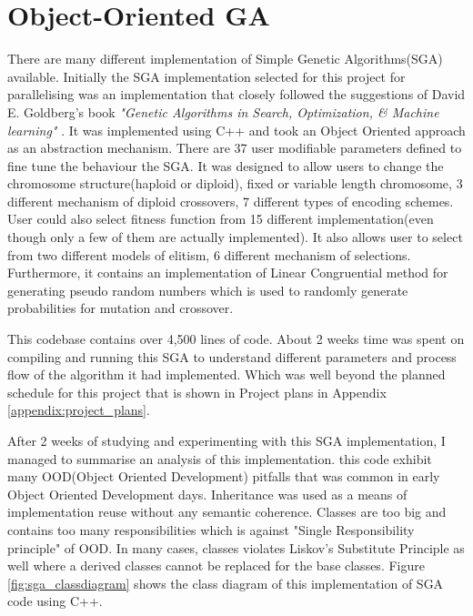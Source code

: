 \section{Object-Oriented GA}
There are many different implementation of Simple Genetic Algorithms(SGA) available. Initially the SGA implementation selected for this project for parallelising was an implementation that closely followed the suggestions of David E. Goldberg's book \textit{"Genetic Algorithms in Search, Optimization, \& Machine learning"} \citep{Goldberg:89}. It was implemented using C++ and took an Object Oriented approach as an abstraction mechanism. There are 37 user modifiable parameters defined to fine tune the behaviour the SGA. It was designed to allow users to change the chromosome structure(haploid or diploid), fixed or variable length chromosome, 3 different mechanism of diploid crossovers, 7 different types of encoding schemes. User could also select fitness function from 15 different implementation(even though only a few of them are actually implemented). It also allows user to select from two different models of elitism, 6 different mechanism of selections. Furthermore, it contains an implementation of Linear Congruential method for generating pseudo random numbers which is used to randomly generate probabilities for mutation and crossover.

This codebase contains over 4,500 lines of code. About 2 weeks time was spent on compiling and running this SGA to understand different parameters and process flow of the algorithm it had implemented. Which was well beyond the planned schedule for this project that is shown in Project plans in Appendix \ref{appendix:project_plans}.

After 2 weeks of studying and experimenting with this SGA implementation, I managed to summarise an analysis of this implementation. this code exhibit many OOD(Object Oriented Development) pitfalls that was common in early Object Oriented Development days. Inheritance was used as a means of implementation reuse without any semantic coherence. Classes are too big and contains too many responsibilities which is against "Single Responsibility principle" of OOD. In many cases, classes violates Liskov's Substitute Principle as well where a derived classes cannot be replaced for the base classes.
Figure \ref{fig:sga_classdiagram} shows the class diagram of this implementation of SGA code using C++.
 

